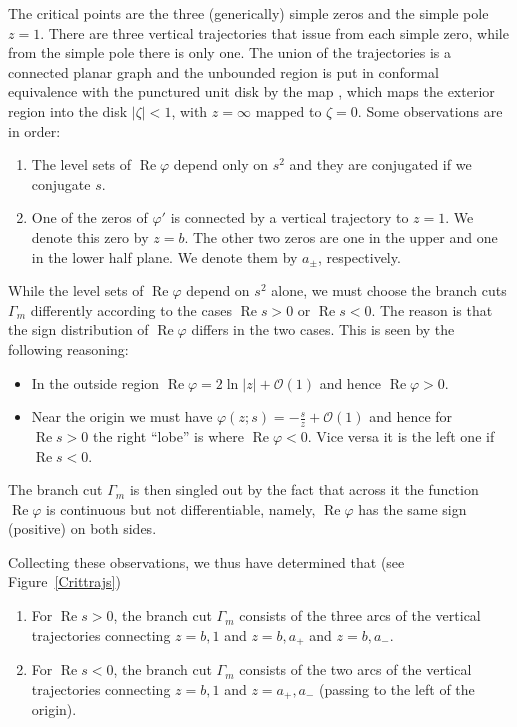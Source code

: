 \documentclass[pdftex]{sigma}
\numberwithin{equation}{section}
\theoremstyle{definition}
\def \Re{\operatorname{Re} }
\begin{document}
The critical points are the three (generically) simple zeros and the simple pole $z=1$. There are three vertical trajectories that issue from each simple zero, while from the simple pole there is only one.
The union of the trajectories is a connected planar graph and the unbounded region is put in conformal equivalence with the punctured unit disk by the map
,
which maps the exterior region into the disk $|\zeta|<1$, with $z=\infty$ mapped to $\zeta=0$.
 Some observations are in order:
 \begin{enumerate}\itemsep=0pt
 \item[(1)]
 The level sets of $\Re \varphi$ depend only on $s^2$ and they are conjugated if we conjugate $s$.
 \item[(2)] One of the zeros of $\varphi'$ is connected by a vertical trajectory to $z=1$. We denote this zero by $z=b$. The other two zeros are one in the upper and one in the lower half plane. We denote them by $a_\pm$, respectively.
 \end{enumerate}
While the level sets of $\Re \varphi$ depend on $s^2$ alone, we must choose the branch cuts $\Gamma_m$ differently according to the cases $\Re s>0$ or $\Re s<0$. The reason is that the sign distribution of $\Re \varphi$ differs in the two cases.
This is seen by the following reasoning:
\begin{itemize}\itemsep=0pt
\item In the outside region $\Re \varphi = 2 \ln|z| + \mathcal O(1)$ and hence $\Re \varphi>0$.
\item Near the origin we must have $\varphi(z;s) = -\frac s z + \mathcal O(1)$ and hence for $\Re s>0$ the right ``lobe'' is where $\Re \varphi<0$. Vice versa it is the left one if $\Re s<0$.
\end{itemize}
 The branch cut $\Gamma_m$ is then singled out by the fact that across it the function $\Re \varphi$ is continuous but not differentiable, namely, $\Re \varphi$ has the same sign (positive) on both sides.

 Collecting these observations, we thus have determined that  (see Figure~\ref{Crittrajs})
 \begin{enumerate}\itemsep=0pt
 \item[(1)] For $\Re s>0$, the branch cut $\Gamma_m$ consists of the three arcs of the vertical trajectories connecting $z=b,1$ and $z=b,a_+$ and $z=b,a_-$.
 \item[(2)] For $\Re s<0$, the branch cut $\Gamma_m$ consists of the two arcs of the vertical trajectories connecting $z=b,1$ and $z=a_+,a_-$ (passing to the left of the origin).
 \end{enumerate}
\end{document}
